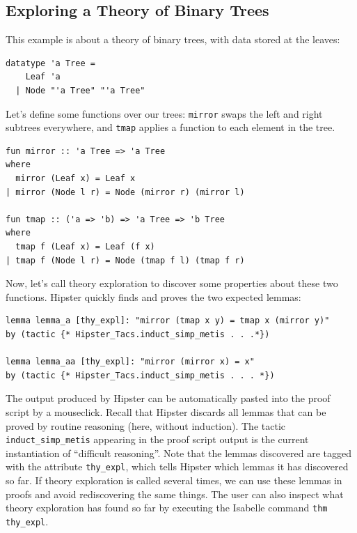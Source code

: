 \subsection{Exploring a Theory of Binary Trees}
\label{sec:tree}
This example is about a theory of binary trees, with data stored at the leaves:
\begin{small}
\begin{verbatim}
datatype 'a Tree = 
    Leaf 'a 
  | Node "'a Tree" "'a Tree"
\end{verbatim}
\end{small}
Let's define some functions over our trees: \texttt{mirror} swaps the left and right subtrees everywhere, and \texttt{tmap} applies a function to each element in the tree.
\begin{small}
\begin{verbatim}
fun mirror :: 'a Tree => 'a Tree
where
  mirror (Leaf x) = Leaf x
| mirror (Node l r) = Node (mirror r) (mirror l)

fun tmap :: ('a => 'b) => 'a Tree => 'b Tree
where
  tmap f (Leaf x) = Leaf (f x)
| tmap f (Node l r) = Node (tmap f l) (tmap f r) 
\end{verbatim} 
\end{small}
Now, let's call theory exploration to discover some properties about
these two functions. Hipster quickly finds and proves the two expected lemmas:
\begin{small}
\begin{verbatim}
lemma lemma_a [thy_expl]: "mirror (tmap x y) = tmap x (mirror y)"
by (tactic {* Hipster_Tacs.induct_simp_metis . . .*})

lemma lemma_aa [thy_expl]: "mirror (mirror x) = x"
by (tactic {* Hipster_Tacs.induct_simp_metis . . . *})
\end{verbatim}
\end{small}
The output produced by Hipster can be automatically pasted into the proof script by a mouseclick. Recall that Hipster discards all lemmas that can be proved by routine reasoning (here, without induction). The tactic \texttt{induct\_simp\_metis} appearing in the proof script output is the current instantiation of ``difficult reasoning''. Note that the lemmas discovered are tagged with the attribute \texttt{thy\_expl}, which tells Hipster which lemmas it has discovered so far. If theory exploration is called several times, we can use these lemmas in proofs and avoid rediscovering the same things. The user can also inspect what theory exploration has found so far by executing the Isabelle command \texttt{thm thy\_expl}.

